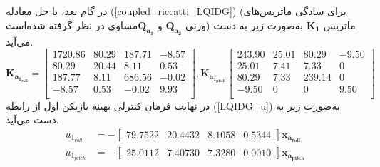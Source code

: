در گام بعد، با حل معادله
(\ref{coupled_riccatti_LQIDG})
(برای سادگی ماتریس‌های وزنی $\boldsymbol{{Q}_{a_2}}$ و $\boldsymbol{{Q}_{a_1}}$مساوی در نظر گرفته شده‌است)
ماتریس
$\boldsymbol{{K}_1}$
به‌صورت زیر به دست می‌آید.
\begin{equation}
	\boldsymbol{K_{a_{1_{roll}}}} = \begin{bmatrix}
1720.86 & 80.29 & 187.71 & -8.57 \\
80.29 & 20.44 & 8.11 & 0.53 \\
187.77 & 8.11 & 686.56 & -0.02 \\
-8.57 & 0.53 & -0.02 & 9.93 \\
	\end{bmatrix}, \boldsymbol{K_{a_{1_{pitch}}}} \begin{bmatrix}
243.90 & 25.01 & 80.29 & -9.50 \\
25.01 & 7.41 & 7.33 & 0 \\
80.29 & 7.33 & 239.14 & 0 \\
-9.50 & 0 & 0 & 9.50 \\
\end{bmatrix}
\end{equation}
در نهایت فرمان کنترلی بهینه بازیکن اول از رابطه
(\ref{LQIDG_u})
به‌صورت زیر به دست می‌آید.
\begin{equation}
	\begin{split}
		u_{1_{roll}} &= -\begin{bmatrix}
			79.7522 &20.4432 &8.1058 &0.5344 
		\end{bmatrix} \boldsymbol{x_{a_{roll}}} \\
	u_{1_{pitch}} &= -\begin{bmatrix}
		25.0112 &7.40730 &7.3280 &0.0010
	\end{bmatrix} \boldsymbol{x_{a_{pitch}}}
	\end{split}
\end{equation}
%	
